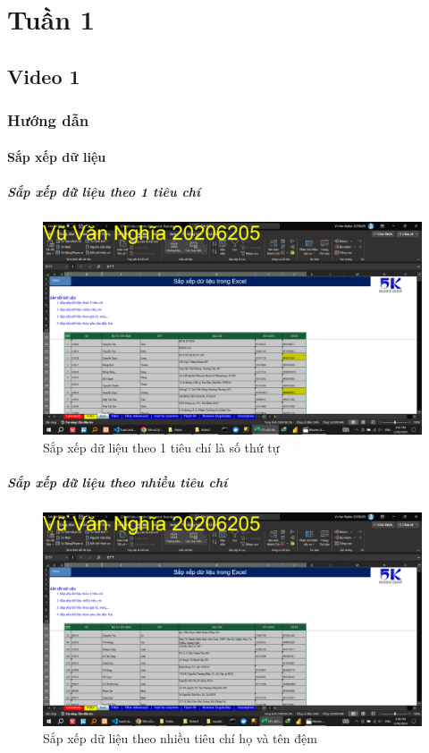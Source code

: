 \documentclass{article}
\begin{document}
\section{Tuần 1}



\subsection{Video 1}

\subsubsection{Hướng dẫn}

\paragraph{Sắp xếp dữ liệu}
\subparagraph{Sắp xếp dữ liệu theo 1 tiêu chí}
\begin{figure}[h]
    \centering
    \includegraphics[scale = 0.15]{Video1/HuongDan/1.png}
    \caption{Sắp xếp dữ liệu theo 1 tiêu chí là số thứ tự}
\end{figure}
\subparagraph{Sắp xếp dữ liệu theo nhiều tiêu chí}
\begin{figure}[h]
    \centering
    \includegraphics[scale = 0.15]{Video1/HuongDan/2.png}
    \caption{Sắp xếp dữ liệu theo  nhiều tiêu chí họ và tên đệm}
\end{figure}
\end{document}
